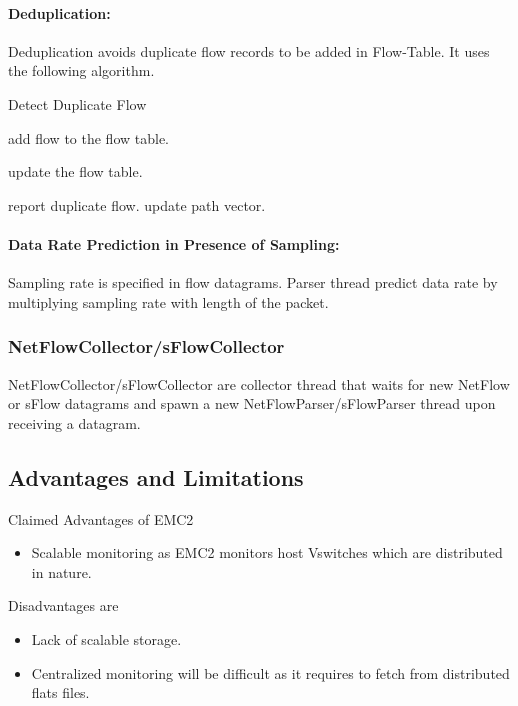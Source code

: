      \paragraph{Deduplication:}
       Deduplication avoids duplicate flow records to be added in Flow-Table. It uses the following algorithm.
       
     \begin{algorithm}[H]
        \caption{Detect Duplicate Flow}
	\label{alg1}

	\begin{algorithmic}

	      \STATE add flow to the flow table.
	      \RETURN 

	  \ELSE 

		  \STATE update the flow table.
		  \RETURN 

	      \ELSE

	        \STATE report duplicate flow.
	        \STATE update path vector.
	        \RETURN 

	      \ENDIF

	  \ENDIF

	\end{algorithmic}

       \end{algorithm}

    \paragraph{Data Rate Prediction in Presence of Sampling:}
       Sampling rate is specified in flow datagrams. Parser thread predict data rate by multiplying  sampling
       rate with length of the packet.
    \subsubsection{NetFlowCollector/sFlowCollector}
      NetFlowCollector/sFlowCollector are collector thread that waits for new NetFlow or sFlow datagrams and
      spawn a new NetFlowParser/sFlowParser thread upon receiving a datagram.
      
    \subsection{Advantages and Limitations}
    Claimed Advantages of EMC2 
    \begin{itemize}
     \item Scalable monitoring as EMC2 monitors host Vswitches which are distributed in nature. 
    \end{itemize}
    Disadvantages are
    
     \begin{itemize}
      \item Lack of scalable storage.
      \item Centralized monitoring will be difficult as it requires to fetch from distributed flats files.
     \end{itemize}